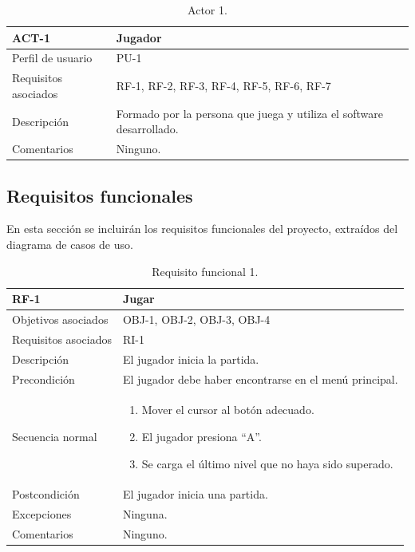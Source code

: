 \begin{table}[h]
	\centering
	\begin{tabular}{| l | p{10cm} |}
		\hline
		\textbf{ACT-1} & \textbf{Jugador}  \\ \hline
		Perfil de usuario & PU-1 \\ \hline
		Requisitos asociados & RF-1, RF-2, RF-3, RF-4, RF-5, RF-6, RF-7 \\ \hline
		Descripción & Formado por la persona que juega y utiliza el software desarrollado. \\ \hline
		Comentarios & Ninguno.  \\ \hline
	\end{tabular}
	\caption{Actor 1.}\label{tab:act-1}
\end{table}
\FloatBarrier{}

\subsection{Requisitos funcionales}
En esta sección se incluirán los requisitos funcionales del proyecto, extraídos del diagrama de casos de uso.


\begin{table}[h]
	\centering
	\begin{tabular}{| l | p{11cm} |}
		\hline
		\textbf{RF-1} & \textbf{Jugar} \\ \hline
		Objetivos asociados & OBJ-1, OBJ-2, OBJ-3, OBJ-4 \\ \hline
		Requisitos asociados & RI-1 \\ \hline
		Descripción & El jugador inicia la partida. \\ \hline
		Precondición & El jugador debe haber encontrarse en el menú principal.  \\ \hline
		Secuencia normal & 
		\begin{enumerate}
			\item Mover el cursor al botón adecuado.
			\item El jugador presiona ``A''.
			\item Se carga el último nivel que no haya sido superado.
		\end{enumerate}
		\\ \hline
		Postcondición & El jugador inicia una partida. \\ \hline
		Excepciones & Ninguna. \\ \hline
		Comentarios & Ninguno. \\ \hline
	\end{tabular}
	\caption{Requisito funcional 1.}\label{tab:rf-1}
\end{table}

